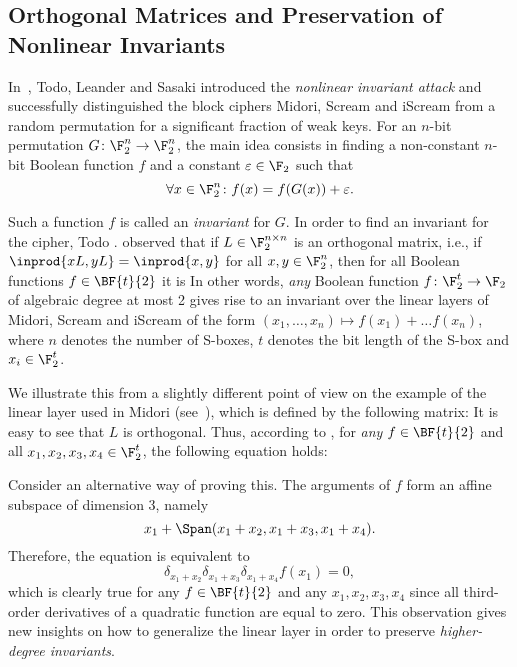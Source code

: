 \subsection{Orthogonal Matrices and Preservation of Nonlinear Invariants}

In~\cite{NonlinInv}, Todo, Leander and Sasaki introduced the \emph{nonlinear invariant attack} and successfully distinguished the block ciphers Midori, Scream and iScream from a random permutation for a significant fraction of weak keys. For an $n$-bit permutation $G \colon \F_2^n \rightarrow \F_2^n$, the main idea consists in finding a non-constant $n$-bit Boolean function $f$ and a constant $\varepsilon \in \F_2$ such that 
$$
\forall x \in \F_2^n\colon f(x) = f(G(x)) + \varepsilon.
$$

Such a function $f$ is called an \emph{invariant} for $G$.
In order to find an invariant for the cipher, Todo \etal. observed that if $L \in \F_2^{n \times n}$ is an orthogonal matrix, i.e., if $\inprod{xL, yL} = \inprod{x, y}$ for all $x,y \in \F_2^n$, then for all Boolean functions $f \in \BF{t}{2}$ it is
In other words, \emph{any} Boolean function $f\colon \F_2^t \rightarrow \F_2$ of algebraic degree at most 2 gives rise to an invariant over the linear layers of Midori, Scream and iScream of the form
$(x_1,\dots,x_n) \mapsto f(x_1)+\dots f(x_n)$, where $n$ denotes the number of S-boxes, $t$ denotes the bit length of the S-box and $x_i \in \F_2^t$.
 
We illustrate this from a slightly different point of view on the example of the linear layer used in Midori (see~\cite{AC:BBISHA15}), which is defined by the following matrix:
It is easy to see that $L$ is orthogonal. Thus, according to , for \emph{any} $f \in \BF{t}{2}$ and all $x_1,x_2,x_3,x_4 \in \F_2^t$, the following equation holds:

Consider an alternative way of proving this. The arguments of $f$ form an affine subspace of dimension 3, namely
$$
x_1 + \Span(x_1+x_2, x_1+x_3, x_1+x_4).
$$
Therefore, the equation is equivalent to
$$
    \delta_{x_1+x_2}\delta_{x_1+x_3}\delta_{x_1+x_4}f(x_1) = 0,
$$
which is clearly true for any $f \in \BF{t}{2}$ and any $x_1,x_2,x_3,x_4$ since all third-order derivatives of a quadratic function are equal to zero. This observation gives new insights on how to generalize the linear layer in order to preserve \emph{higher-degree invariants}.

